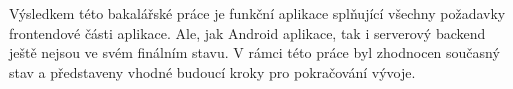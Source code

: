 Výsledkem této bakalářské práce je funkční aplikace splňující všechny požadavky frontendové části aplikace. Ale, jak Android aplikace, tak i serverový backend ještě nejsou ve svém finálním stavu. V rámci této práce byl zhodnocen současný stav a představeny vhodné budoucí kroky pro pokračování vývoje.

